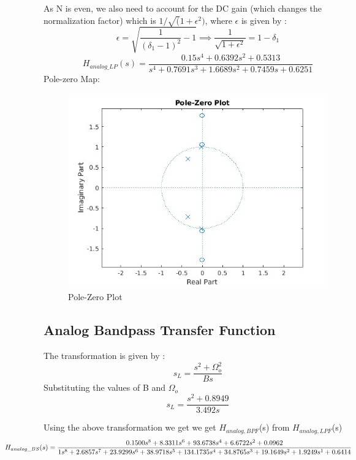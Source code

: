 \documentclass{article}
\begin{document}
As N is even, we also need to account for the DC gain (which changes the normalization factor) which is $1/\sqrt(1+\epsilon^2)$, where $\epsilon$ is given by :
\begin{equation*}
    \epsilon = \sqrt{\frac{1}{(\delta_1 - 1)^2} - 1} \implies \frac{1}{\sqrt{1 + \epsilon^2}} = 1 - \delta_1
\end{equation*}
\begin{equation}
    H_{analog\_LP}(s) = \frac{0.15s^4 + 0.6392s^2 + 0.5313}{s^4 + 0.7691s^3 + 1.6689s^2 + 0.7459s + 0.6251}
\end{equation}
Pole-zero Map:
\begin{figure}[H]
    \centering
    \includegraphics[scale=0.5]{root_bsf.jpg}
    \caption{Pole-Zero Plot}
    \label{fig:my_label}
\end{figure}
\subsection{Analog Bandpass Transfer Function}
The transformation is given by :
\begin{equation*}
    s_L = \frac{s^2 + \Omega_o^2 }{Bs}
\end{equation*}
Substituting the values of B and $\Omega_o$
\begin{equation*}
    s_L = \frac{s^2 + 0.8949}{3.492s}
\end{equation*}


Using the above transformation we get we get $H_{analog,BPF}$(s)  from $H_{analog,LPF}$(s)
\begin{equation*}
    \hspace*{-2cm}
    H_{analog\_BS}(s) = \frac{0.1500s^8 + 8.3311s^6 + 93.6738s^4 + 6.6722s^2 + 0.0962}{1s^8 + 2.6857s^7 + 23.9299s^6 + 38.9718s^5 + 134.1735s^4 + 34.8765s^3 + 19.1649s^2 + 1.9249s^1 + 0.6414}
\end{equation*}
\end{document}
